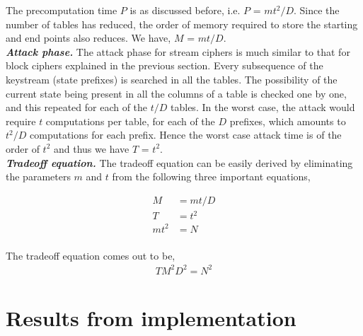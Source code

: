 The precomputation time $P$ is as discussed before, i.e. $P$ = $mt^2/D$. Since the number of tables has reduced, the order of memory required to store the starting and end points also reduces. We have, $M$ = $mt/D$.\\

\noindent \textit{\textbf{Attack phase.}} The attack phase for stream ciphers is much similar to that for block ciphers explained in the previous section. Every subsequence of the keystream (state prefixes) is searched in all the tables. The possibility of the current state being present in all the columns of a table is checked one by one, and this repeated for each of the $t/D$ tables. In the worst case, the attack would require $t$ computations per table, for each of the $D$ prefixes, which amounts to $t^2/D$ computations for each prefix. Hence the worst case attack time is of the order of $t^2$ and thus we have $T$ = $t^2$.\\

\noindent \textit{\textbf{Tradeoff equation.}} The tradeoff equation can be easily derived by eliminating the parameters $m$ and $t$ from the following three important equations,

\begin{align*}
M &= mt/D\\
T &= t^2\\
mt^2 &= N\\
\end{align*}

The tradeoff equation comes out to be,
\begin{align}
\label{eq:tmdto-hellman-stream} TM^2D^2 = N^2
\end{align}

\section{Results from implementation}


	

